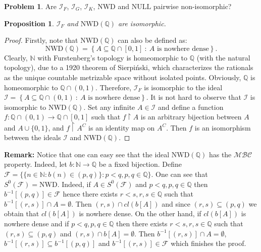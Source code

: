 \documentclass{amsart}
\newtheorem{prop}{Proposition}
\theoremstyle{definition}
\newtheorem{problem}{Problem}
\theoremstyle{definition}
\newcommand{\N}{{\mathbb N}}
\newcommand{\Q}{{\mathbb Q}}
\newcommand{\I}{\mathcal I}
\newcommand{\MB}{S^0}  %
\begin{document}
\begin{problem}
Are $\I_F$, $\I_G$, $\I_K$, $\textrm{NWD}$ and $\textrm{NULL}$ pairwise non-isomorphic?
\end{problem}


\begin{prop}
$\I_F$ and $\textrm{NWD}(\Q)$ are isomorphic.
\end{prop}
\begin{proof}
Firstly, note that $\textrm{NWD}(\Q)$ can also be defined as:
$$\textrm{NWD}(\Q)=\left\{A\subseteq\mathbb{Q}\cap [0,1]\ :\ A \textrm{ is nowhere dense}\right\}.$$
Clearly, $\N$ with Furstenberg's topology is homeomorphic to $\Q$ (with the natural topology), due to a 1920 theorem of Sierpi\'nski, which characterizes the rationals as the unique countable metrizable space without isolated points. Obviously, $\Q$ is homeomorphic to $\Q\cap (0,1)$. Therefore, $\I_F$ is isomorphic to the ideal $\I = \left\{A\subseteq\Q\cap (0,1)\ :\ A \textrm{ is nowhere dense}\right\}$. It is not hard to observe that $\I$ is isomorphic to $\textrm{NWD}(\Q)$. Set any infinite $A\in\I$ and define a function $f : \Q\cap (0,1) \to \Q\cap [0,1]$ such that $f\upharpoonright A$ is an arbitrary bijection between $A$ and $A\cup\{0,1\}$, and $f\upharpoonright A^C$ is an identity map on $A^C$.
Then $f$ is an isomorphism between the ideals $\I$ and $\textrm{NWD}(\Q)$.
\end{proof}

\textbf{Remark:} Notice that one can easy see that the ideal $\textrm{NWD}(\Q)$ has the 
$\mathcal{MBC}$ property. Indeed, let $b\colon \N \to \Q$
be a fixed bijection. Define
$\mathcal{F} = \lbrace \lbrace n\in\N\colon b(n) \in (p, q)\rbrace\colon p < q, p, q \in \Q\rbrace$.
One can see that $\MB(\mathcal{F}) = \mathrm{NWD}$. Indeed, if $A\in \MB(\mathcal{F})$
and $p < q, p, q \in \Q$ then $b^{-1}[(p, q)] \in \mathcal{F}$ hence there
exists $r < s, r, s \in \Q$ such that $b^{-1}[(r, s)] \cap A = \emptyset$.
Then $(r, s) \cap \mathit{cl}(b[A])$ and since $(r, s) \subseteq (p, q)$ we obtain that 
$\mathit{cl}(b[A])$ is nowhere dense. On the other hand, if $\mathit{cl}(b[A])$ is nowhere dense and if
$p < q, p, q \in \Q$ then there exists $r < s, r, s \in \Q$
such that $(r, s) \subseteq (p, q)$ and 
$(r, s) \cap b[A] = \emptyset$. Then $b^{-1}[(r, s)] \cap A = \emptyset$,
$b^{-1}[(r, s)] \subseteq b^{-1}[(p, q)]$ and
$b^{-1}[(r, s)] \in \mathcal{F}$ which finishes the proof.

\end{document}

